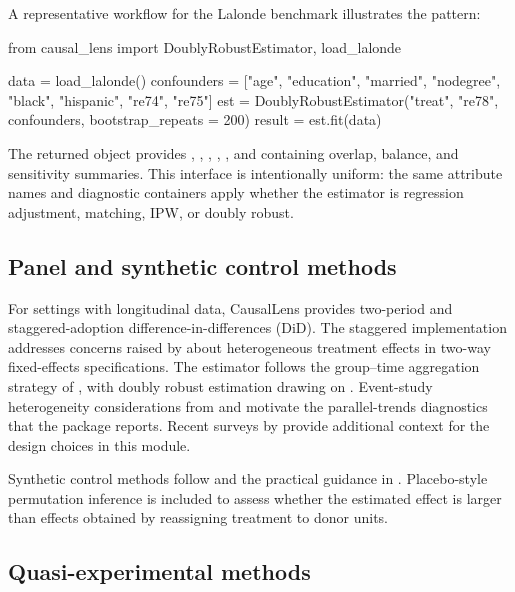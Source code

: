 \documentclass[article]{jss}
\begin{document}
A representative workflow for the Lalonde benchmark illustrates the
pattern:

\begin{Code}
from causal_lens import DoublyRobustEstimator, load_lalonde

data = load_lalonde()
confounders = ["age", "education", "married", "nodegree",
               "black", "hispanic", "re74", "re75"]
est = DoublyRobustEstimator("treat", "re78", confounders,
                            bootstrap_repeats = 200)
result = est.fit(data)
\end{Code}

The returned  object provides ,
, , ,
, and
 containing overlap, balance, and sensitivity
summaries. This interface is intentionally uniform: the same attribute
names and diagnostic containers apply whether the estimator is
regression adjustment, matching, IPW, or doubly robust.

\subsection{Panel and synthetic control methods}\label{sec:panel}

For settings with longitudinal data, CausalLens provides two-period and
staggered-adoption difference-in-differences (DiD). The staggered
implementation addresses concerns raised by
\citet{GoodmanBacon2021} about heterogeneous treatment effects in
two-way fixed-effects specifications. The estimator follows the
group--time aggregation strategy of \citet{CallawaySantAnna2021}, with
doubly robust estimation drawing on \citet{SantAnnaZhao2020}. Event-study
heterogeneity considerations from \citet{SunAbraham2021} and
\citet{deChaisemartinDHaultfoeuille2020} motivate the parallel-trends
diagnostics that the package reports. Recent surveys by
\citet{RothEtAl2023} provide additional context for the design choices in
this module.

Synthetic control methods follow \citet{AbadieDiamondHainmueller2010} and
the practical guidance in \citet{Abadie2021}. Placebo-style permutation
inference is included to assess whether the estimated effect is larger than
effects obtained by reassigning treatment to donor units.

\subsection{Quasi-experimental methods}\label{sec:quasi}
\end{document}
